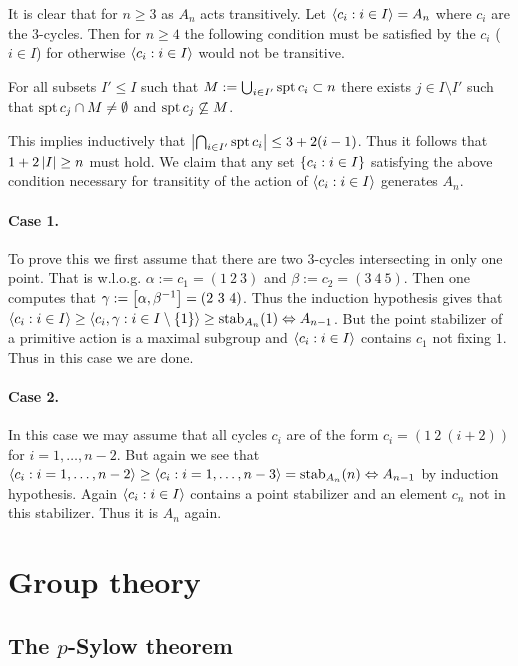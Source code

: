 \documentclass[8pt,a4paper]{article}
\begin{document}
\begin{solution}[\ref{3-cycl-an}]
    It is clear that for $n\geq 3$ as $A_n$ acts transitively. Let $\gen{c_i:i\in I}=A_n$ where $c_i$ are the $3$-cycles. Then for $n\geq 4$ the following condition must be satisfied by the $c_i$ ($i\in I$) for otherwise $\gen{c_i:i\in I}$ would not be transitive.

    For all subsets $I'\leq I$ such that $M:=\bigcup_{i\in I'}{\mathop{\mathrm{spt}}{c_i}}\subset n$ there exists $j\in I\setminus I'$ such that $\mathop{\mathrm{spt}}{c_j}\cap M\neq \emptyset$ and $\mathop{\mathrm{spt}}{c_j}\not\subseteq M$.

    This implies inductively that $\left\vert{\bigcap_{i\in I'}{\mathop{\mathrm{spt}}{c_i}}}\right\vert\leq 3+2(i-1)$. Thus it follows that $1+2\left\vert{I}\right\vert\geq n$ must hold. We claim that any set $\set{c_i:i\in I}$ satisfying the above condition necessary for transitity of the action of $\gen{c_i:i\in I}$ generates $A_n$.
    \paragraph{Case 1.}
    To prove this we first assume that there are two $3$-cycles intersecting in only one point. That is w.l.o.g. $\alpha:=c_1=(1\ 2\ 3)$ and $\beta:=c_2=(3\ 4\ 5)$. Then one computes that $\gamma:=\gcom{\alpha}{\beta^{-1}}=(2\ 3\ 4)$. Thus the induction hypothesis gives that $\gen{c_i:i\in I}\geq \gen{c_i,\gamma:i\in I\setminus\set{1}}\geq\stab[A_n](1)\iso A_{n-1}$.
    But the point stabilizer of a primitive action is a maximal subgroup and $\gen{c_i:i\in I}$ contains $c_1$ not fixing $1$. Thus in this case we are done.
    \paragraph{Case 2.} In this case we may assume that all cycles $c_i$ are of the form $c_i=(1\ 2\ (i+2))$ for $i=1,\ldots,n-2$.
    But again we see that $\gen{c_i:i=1,\ldots,n-2}\geq \gen{c_i:i=1,\ldots,n-3}=\stab[A_n](n)\iso A_{n-1}$ by induction hypothesis.
    Again $\gen{c_i:i\in I}$ contains a point stabilizer and an element $c_n$ not in this stabilizer. Thus it is $A_n$ again.    
\end{solution}    

\section{Group theory}

\subsection{The $p$-Sylow theorem}
\end{document}
